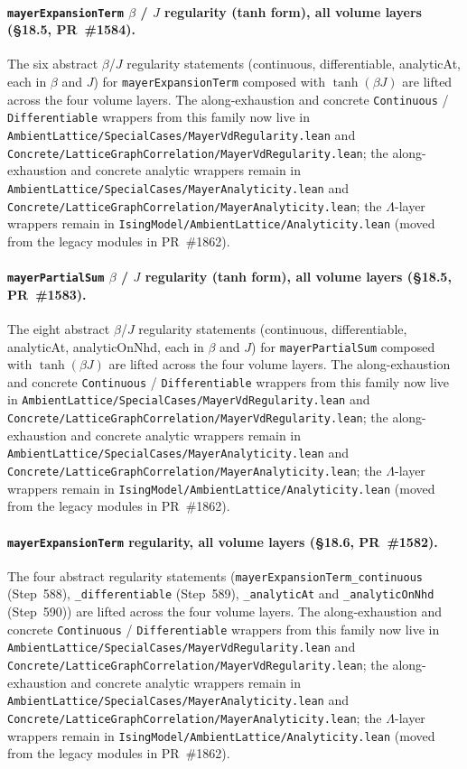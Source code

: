 \documentclass[a4paper,11pt]{article}
\begin{document}
\paragraph{\texttt{mayerExpansionTerm} $\beta$ / $J$ regularity
(tanh form), all volume layers (\S18.5, PR~\#1584).} The six
abstract $\beta$/$J$ regularity statements (continuous,
differentiable, analyticAt, each in $\beta$ and $J$) for
\texttt{mayerExpansionTerm} composed with $\tanh(\beta J)$ are
lifted across the four volume layers. The along-exhaustion
and concrete \texttt{Continuous} / \texttt{Differentiable} wrappers from
this family now live in
\texttt{AmbientLattice/SpecialCases/MayerVdRegularity.lean} and
\texttt{Concrete/LatticeGraphCorrelation/MayerVdRegularity.lean}; the
along-exhaustion and concrete analytic wrappers remain in
\texttt{AmbientLattice/SpecialCases/MayerAnalyticity.lean} and
\texttt{Concrete/LatticeGraphCorrelation/MayerAnalyticity.lean}; the
$\Lambda$-layer wrappers remain in
\texttt{IsingModel/AmbientLattice/Analyticity.lean}
(moved from the legacy modules in PR~\#1862).

\paragraph{\texttt{mayerPartialSum} $\beta$ / $J$ regularity (tanh
form), all volume layers (\S18.5, PR~\#1583).} The eight abstract
$\beta$/$J$ regularity statements (continuous, differentiable,
analyticAt, analyticOnNhd, each in $\beta$ and $J$) for
\texttt{mayerPartialSum} composed with $\tanh(\beta J)$ are lifted
across the four volume layers. The along-exhaustion
and concrete \texttt{Continuous} / \texttt{Differentiable} wrappers from
this family now live in
\texttt{AmbientLattice/SpecialCases/MayerVdRegularity.lean} and
\texttt{Concrete/LatticeGraphCorrelation/MayerVdRegularity.lean}; the
along-exhaustion and concrete analytic wrappers remain in
\texttt{AmbientLattice/SpecialCases/MayerAnalyticity.lean} and
\texttt{Concrete/LatticeGraphCorrelation/MayerAnalyticity.lean}; the
$\Lambda$-layer wrappers remain in
\texttt{IsingModel/AmbientLattice/Analyticity.lean}
(moved from the legacy modules in PR~\#1862).

\paragraph{\texttt{mayerExpansionTerm} regularity, all volume layers
(\S18.6, PR~\#1582).} The four abstract regularity statements
(\texttt{mayerExpansionTerm\_continuous} (Step~588),
\texttt{\_differentiable} (Step~589),
\texttt{\_analyticAt} and \texttt{\_analyticOnNhd} (Step~590)) are
lifted across the four volume layers. The along-exhaustion
and concrete \texttt{Continuous} / \texttt{Differentiable} wrappers from
this family now live in
\texttt{AmbientLattice/SpecialCases/MayerVdRegularity.lean} and
\texttt{Concrete/LatticeGraphCorrelation/MayerVdRegularity.lean}; the
along-exhaustion and concrete analytic wrappers remain in
\texttt{AmbientLattice/SpecialCases/MayerAnalyticity.lean} and
\texttt{Concrete/LatticeGraphCorrelation/MayerAnalyticity.lean}; the
$\Lambda$-layer wrappers remain in
\texttt{IsingModel/AmbientLattice/Analyticity.lean}
(moved from the legacy modules in PR~\#1862).
\end{document}
